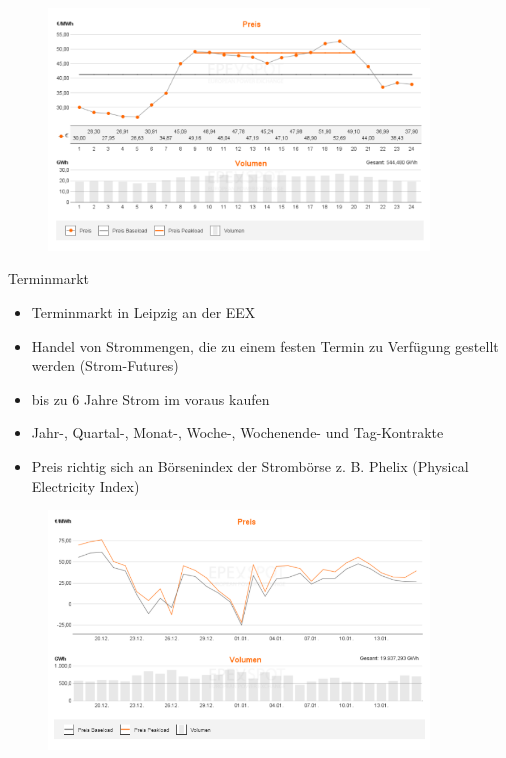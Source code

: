 \documentclass[aspectratio=1610, professionalfonts, 9pt]{beamer}
\begin{document}
\begin{frame}
  \begin{figure}
  \includegraphics[width=0.9\textwidth]{images/10_1_2018_spot.PNG}
\end{figure}
\end{frame}

\begin{frame}{Terminmarkt}
\begin{itemize}
  \item Terminmarkt in Leipzig an der EEX
  \item Handel von Strommengen, die zu einem festen Termin zu Verfügung gestellt werden (Strom-Futures)
  \item bis zu 6 Jahre Strom im voraus kaufen
  \item Jahr-, Quartal-, Monat-, Woche-,  Wochenende- und Tag-Kontrakte
  \item Preis richtig sich an Börsenindex der Strombörse z. B. Phelix (Physical Electricity Index)
\end{itemize}
\end{frame}

\begin{frame}
  \begin{figure}
  \includegraphics[width=0.9\textwidth]{images/Phelix_1monat.PNG}
\end{figure}
\end{frame}
\end{document}
